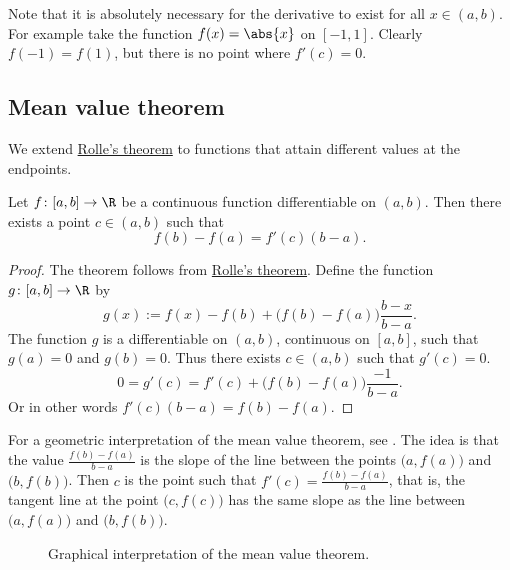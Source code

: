 \documentclass[12pt]{book}
\begin{document}
Note that it is absolutely necessary for the derivative to exist for all $x
\in (a,b)$.
For example take the function $f(x) = \abs{x}$ on $[-1,1]$.
Clearly $f(-1) = f(1)$, but there is no point where $f'(c) = 0$.

\subsection*{Mean value theorem}

We extend \hyperref[thm:rolle]{Rolle's theorem}
to functions that attain different
values at the endpoints.

\begin{thm} \label{thm:mvt}
Let $f \colon [a,b] \to \R$ be a continuous function
differentiable on $(a,b)$.
Then there exists a point $c \in (a,b)$
such that
\begin{equation*}
f(b)-f(a) = f'(c)(b-a) .
\end{equation*}
\end{thm}

\begin{proof}
The theorem follows from \hyperref[thm:rolle]{Rolle's theorem}.
Define the
function $g \colon [a,b] \to \R$ by
\begin{equation*}
g(x) := f(x)-f(b)+\bigl(f(b)-f(a)\bigr)\frac{b-x}{b-a}.
\end{equation*}
The function $g$ is a differentiable on $(a,b)$,
continuous on $[a,b]$, such that $g(a) = 0$ and $g(b) = 0$.
Thus there exists
$c \in (a,b)$ such that $g'(c) = 0$.
\begin{equation*}
0 = g'(c) = f'(c) + \bigl(f(b)-f(a)\bigr)\frac{-1}{b-a} .
\end{equation*}
Or in other words
$f'(c)(b-a) = f(b)-f(a)$.
\end{proof}

For a geometric interpretation of the mean value theorem, see
.
The idea is that the value $\frac{f(b)-f(a)}{b-a}$
is the slope of the line between the points $\bigl(a,f(a)\bigr)$
and $\bigl(b,f(b)\bigr)$.
Then $c$ is the point such that $f'(c) = \frac{f(b)-f(a)}{b-a}$, that 
is, the tangent line at the point $\bigl(c,f(c)\bigr)$ has the same slope as the
line between $\bigl(a,f(a)\bigr)$ and $\bigl(b,f(b)\bigr)$.

\begin{figure}[h!t]
\begin{center}

\caption{Graphical interpretation of the mean value theorem.\label{mvtfig}}
\end{center}
\end{figure}
\end{document}
